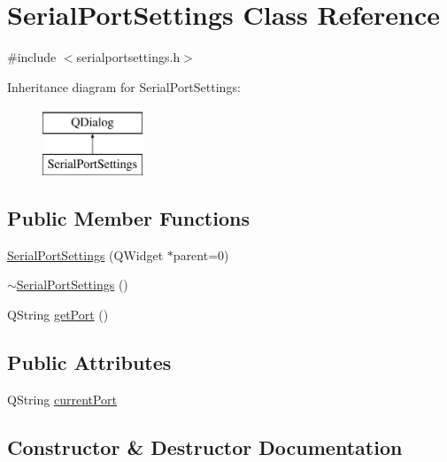 \hypertarget{class_serial_port_settings}{}\section{Serial\+Port\+Settings Class Reference}
\label{class_serial_port_settings}


{\ttfamily \#include $<$serialportsettings.\+h$>$}

Inheritance diagram for Serial\+Port\+Settings\+:\begin{figure}[H]
\begin{center}
\leavevmode
\includegraphics[height=2.000000cm]{class_serial_port_settings}
\end{center}
\end{figure}
\subsection*{Public Member Functions}
\begin{DoxyCompactItemize}
\item 
\hyperlink{class_serial_port_settings_a5563c4a12c42c2487565fb105b9f370c}{Serial\+Port\+Settings} (Q\+Widget $\ast$parent=0)
\item 
\hyperlink{class_serial_port_settings_a4a9fcf3027d619aaef512aeb9f5a2b8f}{$\sim$\+Serial\+Port\+Settings} ()
\item 
Q\+String \hyperlink{class_serial_port_settings_aa1aa401b8b0b394b182bf3e0b8cf146b}{get\+Port} ()
\end{DoxyCompactItemize}
\subsection*{Public Attributes}
\begin{DoxyCompactItemize}
\item 
Q\+String \hyperlink{class_serial_port_settings_ab6d73655f68c506e50fc81b7a595aa3d}{current\+Port}
\end{DoxyCompactItemize}


\subsection{Constructor \& Destructor Documentation}
\mbox{\label{class_serial_port_settings_a5563c4a12c42c2487565fb105b9f370c}} 
